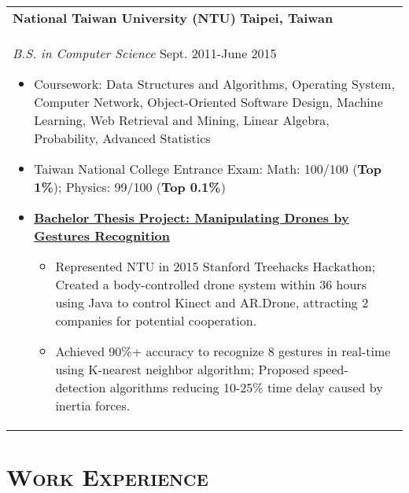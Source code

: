 \documentclass[a4paper,11pt]{article} %
\begin{document}
{\begin{tabular}{p{18.5cm}}
{\large\bf{National Taiwan University (NTU)}} \hfill \bf{Taipei, Taiwan}\\
{\it B.S. in Computer Science} \hfill Sept. 2011-June 2015
\begin{itemize}
\item Coursework: Data Structures and Algorithms, Operating System, Computer Network, Object-Oriented Software Design, Machine Learning, Web Retrieval and Mining, Linear Algebra, Probability, Advanced Statistics 
\item Taiwan National College Entrance Exam:  Math: 100/100 (\textbf{Top 1\%}); Physics: 99/100 (\textbf{Top 0.1\%})
\item \textbf{\href{https://www.youtube.com/watch?v=jxsZaQ6PcXU}{Bachelor Thesis Project: Manipulating Drones by Gestures Recognition}}
\begin{itemize}%
	\item Represented NTU in 2015 Stanford Treehacks Hackathon; Created a body-controlled drone system within 36 hours using Java to control Kinect and AR.Drone, attracting 2 companies for potential cooperation. 
	\item Achieved 90\%+ accuracy to recognize 8 gestures in real-time using K-nearest neighbor algorithm; Proposed speed-detection algorithms reducing 10-25\% time delay caused by inertia forces. \vspace*{-\baselineskip}
\end{itemize}
\end{itemize} 
\end{tabular}

\section{\Large\bf\textsc{Work Experience}}
\begin{tabular}{p{18.5cm}}


\end{tabular}}
\end{document}
